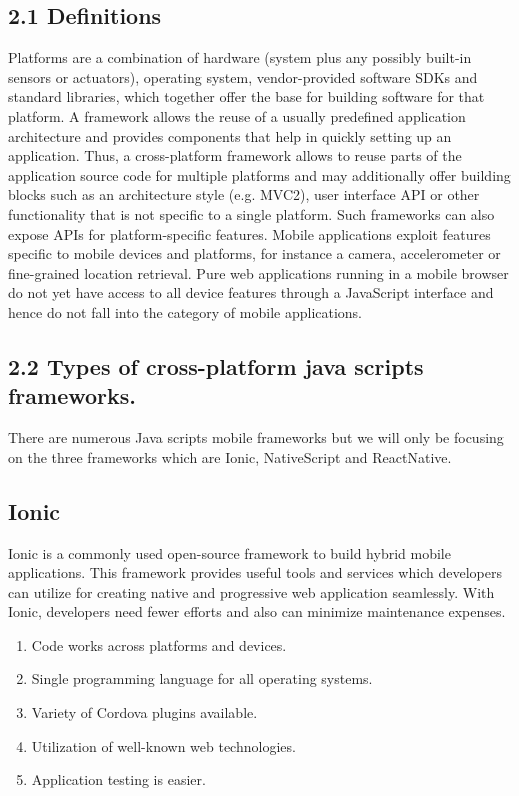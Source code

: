 \documentclass[12pt]{extreport}
\begin{document}
\subsection*{2.1 Definitions}

Platforms are a combination of hardware (system plus any possibly built-in sensors or actuators), operating system, vendor-provided software SDKs and standard libraries, which together offer the base for building software for that platform.
A framework allows the reuse of a usually predefined application architecture and provides components that help in quickly setting up an application. Thus, a cross-platform framework allows to reuse parts of the application source code for multiple platforms and may additionally offer building blocks such as an architecture style (e.g. MVC2), user interface API or other functionality that is not specific to a single platform. Such frameworks can also expose APIs for platform-specific features.
Mobile applications exploit features specific to mobile devices and platforms, for instance a camera, accelerometer or fine-grained location retrieval. Pure web applications running in a mobile browser do not yet have access to all device features through a JavaScript interface and hence do not fall into the category of mobile applications.

\subsection*{2.2 Types of cross-platform java scripts frameworks.}

There are numerous Java scripts mobile frameworks but we will only be focusing on the three frameworks which are Ionic, NativeScript and ReactNative.
\subsection*{Ionic}
Ionic is a commonly used open-source framework to build hybrid mobile applications. This framework provides useful tools and services which developers can utilize for creating native and progressive web application seamlessly. With Ionic, developers need fewer efforts and also can minimize maintenance expenses.
\begin{enumerate}
	\item{Code works across platforms and devices.}
	\item{Single programming language for all operating systems.}
	\item{Variety of Cordova plugins available.}
	\item{Utilization of well-known web technologies.}
	\item{Application testing is easier.}
\end{enumerate}
\end{document}
